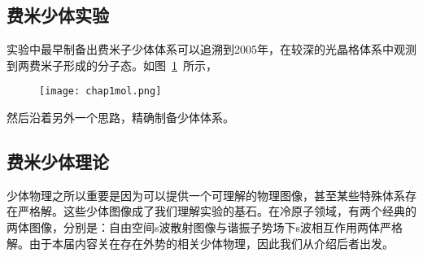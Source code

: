 \subsection{费米少体实验}
实验中最早制备出费米子少体体系可以追溯到2005年，在较深的光晶格体系中观测到两费米子形成的分子态\cite{EsslingerFermiSea,Esslinger1DMol,Esslinger3DMol,Hecker3DMol}。如图~\ref{chap1mol}~所示，
\begin{figure}[!htbp]
    \centering
    \texttt{[image: chap1mol.png]}
    \label{chap1mol}
\end{figure}

然后沿着另外一个思路，精确制备少体体系\cite{SerwaneDeterministic,WenzFermiSeaOnebyOne,zurn2012fermionization,Zurn2013Pairing,MurmannSpinChain,MurmannTwoFermionDoubleWell}。



\subsection{费米少体理论}

少体物理之所以重要是因为可以提供一个可理解的物理图像，甚至某些特殊体系存在严格解。这些少体图像成了我们理解实验的基石。在冷原子领域，有两个经典的两体图像，分别是：自由空间s波散射图像与谐振子势场下s波相互作用两体严格解。由于本届内容关在存在外势的相关少体物理，因此我们从介绍后者出发。


